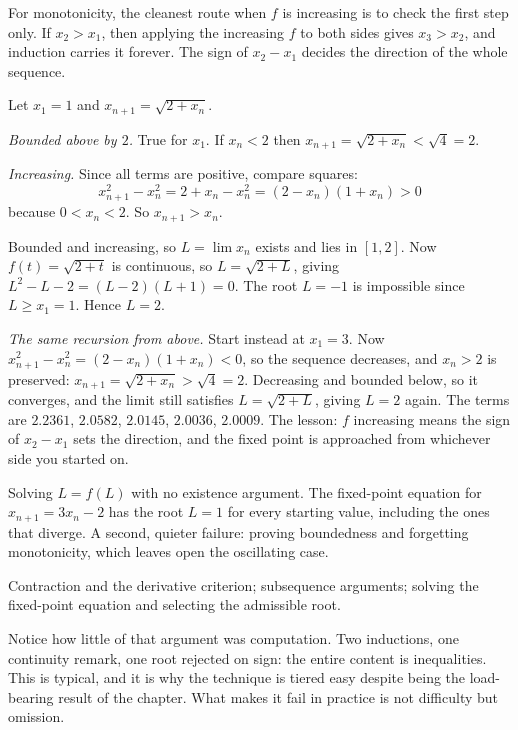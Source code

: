 For monotonicity, the cleanest route when $f$ is increasing is to check the first step only. If $x_2>x_1$, then applying the increasing $f$ to both sides gives $x_3>x_2$, and induction carries it forever. The sign of $x_2-x_1$ decides the direction of the whole sequence.

\begin{worked}
Let $x_1=1$ and $x_{n+1}=\sqrt{2+x_n}$.

\emph{Bounded above by $2$.} True for $x_1$. If $x_n<2$ then $x_{n+1}=\sqrt{2+x_n}<\sqrt{4}=2$.

\emph{Increasing.} Since all terms are positive, compare squares:
\[x_{n+1}^2-x_n^2=2+x_n-x_n^2=(2-x_n)(1+x_n)>0\]
because $0<x_n<2$. So $x_{n+1}>x_n$.

Bounded and increasing, so $L=\lim x_n$ exists and lies in $[1,2]$. Now $f(t)=\sqrt{2+t}$ is continuous, so $L=\sqrt{2+L}$, giving $L^2-L-2=(L-2)(L+1)=0$. The root $L=-1$ is impossible since $L\geq x_1=1$. Hence $L=2$.

\emph{The same recursion from above.} Start instead at $x_1=3$. Now $x_{n+1}^2-x_n^2=(2-x_n)(1+x_n)<0$, so the sequence decreases, and $x_n>2$ is preserved: $x_{n+1}=\sqrt{2+x_n}>\sqrt4=2$. Decreasing and bounded below, so it converges, and the limit still satisfies $L=\sqrt{2+L}$, giving $L=2$ again. The terms are $2.2361$, $2.0582$, $2.0145$, $2.0036$, $2.0009$. The lesson: $f$ increasing means the sign of $x_2-x_1$ sets the direction, and the fixed point is approached from whichever side you started on.
\end{worked}

\begin{trap}
Solving $L=f(L)$ with no existence argument. The fixed-point equation for $x_{n+1}=3x_n-2$ has the root $L=1$ for every starting value, including the ones that diverge. A second, quieter failure: proving boundedness and forgetting monotonicity, which leaves open the oscillating case.
\end{trap}

\begin{seealsob}Contraction and the derivative criterion; subsequence arguments; solving the fixed-point equation and selecting the admissible root.\end{seealsob}

Notice how little of that argument was computation. Two inductions, one continuity remark, one root rejected on sign: the entire content is inequalities. This is typical, and it is why the technique is tiered easy despite being the load-bearing result of the chapter. What makes it fail in practice is not difficulty but omission.

